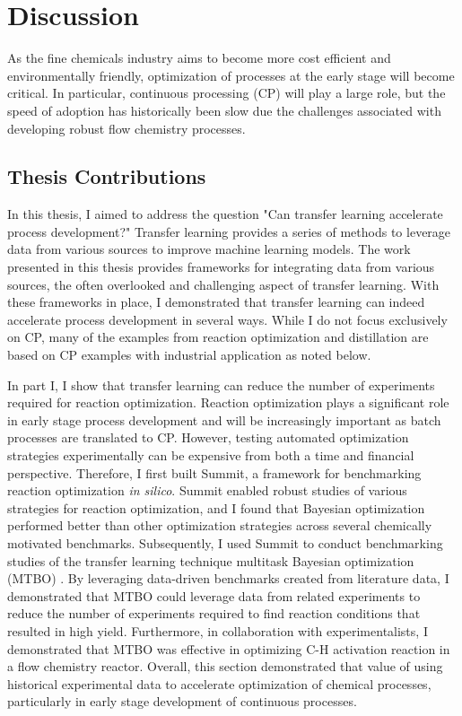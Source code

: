 \chapter{Discussion}\label{ch:discussion} 

As the fine chemicals industry aims to become more cost efficient and environmentally friendly, optimization of processes at the early stage will become critical. In particular, continuous processing (CP) will play a large role, but the speed of adoption has historically been slow due the challenges associated with developing robust flow chemistry processes.

\section{Thesis Contributions}

In this thesis, I aimed to address the question "Can transfer learning accelerate process development?"  Transfer learning provides a series of methods to leverage data from various sources to improve machine learning models. The work presented in this thesis provides frameworks for integrating data from various sources, the often overlooked and challenging aspect of transfer learning. With these frameworks in place, I demonstrated that transfer learning can indeed accelerate process development in several ways. While I do not focus exclusively on CP, many of the examples from reaction optimization and distillation are based on CP examples with industrial application as noted below.

In part I, I show that transfer learning can reduce the number of experiments required for reaction optimization. Reaction optimization plays a significant role in early stage process development and will be increasingly important as batch processes are translated to CP. However, testing automated optimization strategies experimentally can be expensive from both a time and financial perspective.  Therefore, I first built Summit, a framework for benchmarking reaction optimization \textit{in silico}. Summit enabled robust studies of various strategies for reaction optimization, and I found that Bayesian optimization performed better than other optimization strategies across several chemically motivated benchmarks. Subsequently, I used Summit to conduct benchmarking studies of the transfer learning technique multitask Bayesian optimization (MTBO) \cite{Swersky2013}. By leveraging data-driven benchmarks created from literature data, I demonstrated that MTBO could leverage data from related experiments to reduce the number of experiments required to find reaction conditions that resulted in high yield. Furthermore, in collaboration with experimentalists, I demonstrated that MTBO was effective in optimizing C-H activation reaction in a flow chemistry reactor.  Overall, this section demonstrated that value of using historical experimental data to accelerate optimization of chemical processes, particularly in early stage development of continuous processes. 

